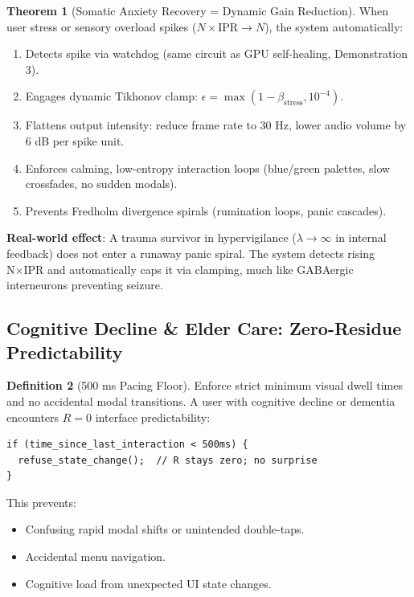\documentclass[11pt,oneside]{article}
\theoremstyle{definition}
\newtheorem{theorem}{Theorem}
\newtheorem{definition}[theorem]{Definition}
\begin{document}
\begin{theorem}[Somatic Anxiety Recovery = Dynamic Gain Reduction]
When user stress or sensory overload spikes ($N \times \text{IPR} \to N$), the system automatically:

\begin{enumerate}
  \item Detects spike via watchdog (same circuit as GPU self-healing, Demonstration 3).
  \item Engages dynamic Tikhonov clamp: $\epsilon = \max(1 - \beta_{\text{stress}}, 10^{-4})$.
  \item Flattens output intensity: reduce frame rate to 30 Hz, lower audio volume by 6 dB per spike unit.
  \item Enforces calming, low-entropy interaction loops (blue/green palettes, slow crossfades, no sudden modals).
  \item Prevents Fredholm divergence spirals (rumination loops, panic cascades).
\end{enumerate}
\end{theorem}

\textbf{Real-world effect}: A trauma survivor in hypervigilance ($\lambda \to \infty$ in internal feedback) does not enter a runaway panic spiral. The system detects rising N×IPR and automatically caps it via clamping, much like GABAergic interneurons preventing seizure.

\subsection{Cognitive Decline \& Elder Care: Zero-Residue Predictability}

\begin{definition}[500 ms Pacing Floor]
Enforce strict minimum visual dwell times and no accidental modal transitions. A user with cognitive decline or dementia encounters $R = 0$ interface predictability:

\begin{lstlisting}
if (time_since_last_interaction < 500ms) {
  refuse_state_change();  // R stays zero; no surprise
}
\end{lstlisting}

This prevents:
\begin{itemize}
  \item Confusing rapid modal shifts or unintended double-taps.
  \item Accidental menu navigation.
  \item Cognitive load from unexpected UI state changes.
\end{itemize}
\end{definition}
\end{document}
